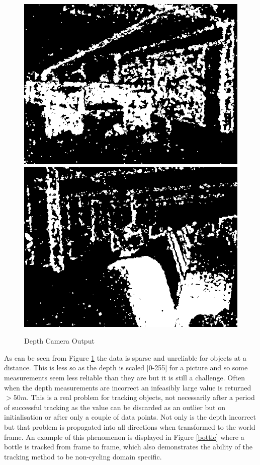 \documentclass[11pt,twoside]{report}
\begin{document}
\noindent \begin{figure}[h!]
	\includegraphics[width = 0.5\hsize]{figures/depth_image_1.png}
	\includegraphics[width = 0.5\hsize]{figures/depth_image_2.png}
	\caption{Depth Camera Output}
	\label{DCO}
\end{figure}

As can be seen from Figure \ref{DCO} the data is sparse and unreliable for objects at a distance. This is less so as the depth is scaled [0-255] for a picture and so some measurements seem less reliable than they are but it is still a challenge. Often when the depth measurements are incorrect an infeasibly large value is returned $>50m$. This is a real problem for tracking objects, not necessarily after a period of successful tracking as the value can be discarded as an outlier but on initialisation or after only a couple of data points. Not only is the depth incorrect but that problem is propagated into all directions when transformed to the world frame. An example of this phenomenon is displayed in Figure \ref{bottle} where a bottle is tracked from frame to frame, which also demonstrates the ability of the tracking method to be non-cycling domain specific.
\end{document}
